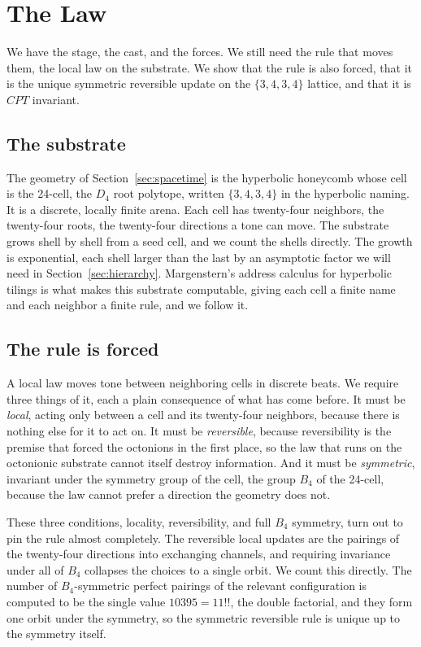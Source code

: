 \section{The Law} \label{sec:law}

We have the stage, the cast, and the forces. We still need the rule that moves them, the local law on the substrate.
We show that the rule is also forced, that it is the unique symmetric reversible update on the $\{3,4,3,4\}$ lattice,
and that it is $CPT$ invariant.

\subsection{The substrate}

The geometry of Section~\ref{sec:spacetime} is the hyperbolic honeycomb whose cell is the 24-cell, the $D_4$ root
polytope, written $\{3,4,3,4\}$ in the hyperbolic naming. It is a discrete, locally finite arena. Each cell has
twenty-four neighbors, the twenty-four roots, the twenty-four directions a tone can move. The substrate grows shell by
shell from a seed cell, and we count the shells directly. The growth is exponential, each shell larger than the last by
an asymptotic factor we will need in Section~\ref{sec:hierarchy}. Margenstern's address calculus for hyperbolic
tilings \cite{margenstern2007vol1, margenstern2008vol2} is what makes this substrate computable, giving each cell a
finite name and each neighbor a finite rule, and we follow it.

\subsection{The rule is forced}

A local law moves tone between neighboring cells in discrete beats. We require three things of it, each a plain
consequence of what has come before. It must be \emph{local}, acting only between a cell and its twenty-four neighbors,
because there is nothing else for it to act on. It must be \emph{reversible}, because reversibility is the premise that
forced the octonions in the first place, so the law that runs on the octonionic substrate cannot itself destroy
information. And it must be \emph{symmetric}, invariant under the symmetry group of the cell, the group $B_4$ of the
24-cell, because the law cannot prefer a direction the geometry does not.

These three conditions, locality, reversibility, and full $B_4$ symmetry, turn out to pin the rule almost completely.
The reversible local updates are the pairings of the twenty-four directions into exchanging channels, and requiring
invariance under all of $B_4$ collapses the choices to a single orbit. We count this directly. The number of
$B_4$-symmetric perfect pairings of the relevant configuration is computed to be the single value $10395 = 11!! $, the
double factorial, and they form one orbit under the symmetry, so the symmetric reversible rule is unique up to the
symmetry itself.

